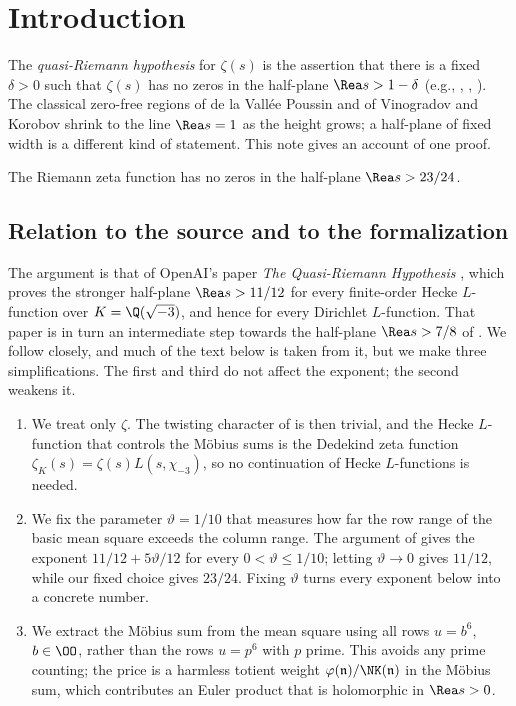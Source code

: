 \section{Introduction}\label{sec:intro}

The \emph{quasi-Riemann hypothesis} for $\zeta(s)$ is the assertion that there is a
fixed $\delta>0$ such that $\zeta(s)$ has no zeros in the half-plane $\Rea s>1-\delta$
(e.g., \cite[\S1]{BG17}, \cite[p.~274]{MS02}, \cite[\S2]{BR18}). The classical zero-free
regions of de la Vall\'ee Poussin \cite{VP99} and of Vinogradov and Korobov
\cite{Vin58,Kor58} shrink to the line $\Rea s=1$ as the height grows; a half-plane of fixed
width is a different kind of statement. This note gives an account of one proof.

\begin{theorem}\label{thm:main}
The Riemann zeta function has no zeros in the half-plane $\Rea s>23/24$.
\end{theorem}

\subsection{Relation to the source and to the formalization}
The argument is that of OpenAI's paper \emph{The Quasi-Riemann Hypothesis}
\cite{OpenAI26b}, which proves the stronger half-plane $\Rea s>11/12$ for every
finite-order Hecke $L$-function over $K=\Q(\sqrt{-3})$, and hence for every Dirichlet
$L$-function. That paper is in turn an intermediate step towards the half-plane
$\Rea s>7/8$ of \cite{OpenAI26}. We follow \cite{OpenAI26b} closely, and much of the text
below is taken from it, but we make three simplifications. The first and third do not affect
the exponent; the second weakens it.
\begin{enumerate}
\item We treat only $\zeta$. The twisting character of \cite{OpenAI26b} is then trivial, and
the Hecke $L$-function that controls the Möbius sums is the Dedekind zeta function
$\zeta_K(s)=\zeta(s)L(s,\chi_{-3})$, so no continuation of Hecke $L$-functions is needed.
\item We fix the parameter $\vartheta=1/10$ that measures how far the row range of the
basic mean square exceeds the column range. The argument of \cite{OpenAI26b} gives the
exponent $11/12+5\vartheta/12$ for every $0<\vartheta\le1/10$; letting $\vartheta\to0$ gives
$11/12$, while our fixed choice gives $23/24$. Fixing $\vartheta$ turns every exponent below
into a concrete number.
\item We extract the Möbius sum from the mean square using all rows $u=b^6$, $b\in\OO$,
rather than the rows $u=p^6$ with $p$ prime. This avoids any prime counting; the price is
a harmless totient weight $\varphi(\mathfrak n)/\NK(\mathfrak n)$ in the Möbius sum, which
contributes an Euler product that is holomorphic in $\Rea s>0$.
\end{enumerate}

